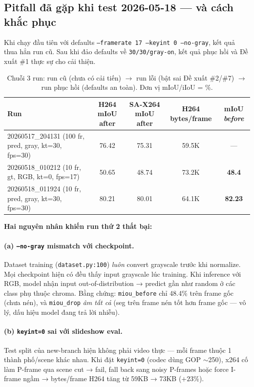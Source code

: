 \documentclass[12pt,a4paper]{article}
\begin{document}
\subsection{Pitfall đã gặp khi test 2026-05-18 — và cách khắc phục}
\label{sec:pitfall}

Khi chạy đầu tiên với defaults \texttt{--framerate 17 --keyint 0 --no-gray}, kết
quả thua hẳn run cũ. Sau khi đảo defaults về \texttt{30/30/gray-on}, kết quả phục
hồi và Đề xuất \#1 thực sự cho cải thiện.

\begin{table}[H]
\centering
\small
\caption{Chuỗi 3 run: run cũ (chưa có cải tiến) $\to$ run lỗi (bật sai Đề xuất
\#2/\#7) $\to$ run phục hồi (defaults an toàn). Đơn vị mIoU/iIoU = \%.}
\begin{tabular}{lcccc}
\toprule
Run & H264 mIoU after & SA-X264 mIoU after & H264 bytes/frame & mIoU \emph{before} \\
\midrule
20260517\_204131 (100 fr, pred, gray, kt=30, fps=30) & 76.42 & 75.31 & 59.5K  & — \\
20260518\_010212 (10 fr, gt, RGB, kt=0, fps=17)      & 50.65 & 48.74 & 73.2K  & \textbf{48.4} \\
20260518\_011924 (10 fr, pred, gray, kt=30, fps=30)  & 80.21 & 80.01 & 64.1K  & \textbf{82.23} \\
\bottomrule
\end{tabular}
\end{table}

\textbf{Hai nguyên nhân khiến run thứ 2 thất bại:}

\paragraph{(a) \texttt{--no-gray} mismatch với checkpoint.} Dataset training
(\texttt{dataset.py:100}) \emph{luôn} convert grayscale trước khi normalize. Mọi
checkpoint hiện có đều thấy input grayscale lúc training. Khi inference với
RGB, model nhận input out-of-distribution → predict gần như random ở các class
phụ thuộc chroma. Bằng chứng: \texttt{miou\_before} chỉ 48.4\% trên frame gốc
(chưa nén), và \texttt{miou\_drop} \emph{âm tất cả} (seg trên frame nén tốt hơn
frame gốc — vô lý, dấu hiệu model đang trả lời nhiễu).

\paragraph{(b) \texttt{keyint=0} sai với slideshow eval.} Test split của
new-branch hiện không phải video thực — mỗi frame thuộc 1 thành phố/scene khác
nhau. Khi đặt \texttt{keyint=0} (codec dùng GOP $\sim$250), x264 cố làm P-frame
qua scene cut → fail, fall back sang noisy P-frames hoặc force I-frame ngầm →
bytes/frame H264 tăng từ 59KB → 73KB ($+23\%$).
\end{document}
